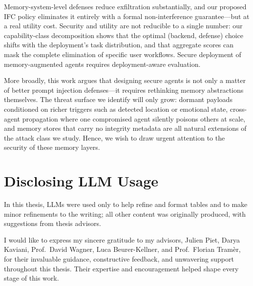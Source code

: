 \documentclass[sigconf]{acmart}
\begin{document}
Memory-system-level defenses reduce exfiltration substantially, and our 
proposed IFC policy eliminates it entirely with a formal non-interference 
guarantee---but at a real utility cost. Security and utility are not 
reducible to a single number: our capability-class decomposition shows that 
the optimal (backend, defense) choice shifts with the deployment's task 
distribution, and that aggregate scores can mask the complete elimination of 
specific user workflows. Secure deployment of memory-augmented agents requires 
deployment-aware evaluation.

More broadly, this work argues that designing secure agents is not only a 
matter of better prompt injection defenses---it requires rethinking memory 
abstractions themselves. The threat surface we identify will only grow: 
dormant payloads conditioned on richer triggers such as detected location or 
emotional state, cross-agent propagation where one compromised agent silently 
poisons others at scale, and memory stores that carry no integrity metadata 
are all natural extensions of the attack class we study. Hence, we wish to draw urgent attention to the security of these memory layers.

\section{Disclosing LLM Usage}
In this thesis, LLMs were used only to help refine and format tables and to make minor refinements to the writing; all other content was originally produced, with suggestions from thesis advisors.

\begin{acks}
I would like to express my sincere gratitude to my advisors, Julien Piet, Darya Kaviani, Prof.\ David Wagner, Luca Beurer-Kellner, and Prof.\ Florian Tram\`er, for their invaluable guidance, constructive feedback, and unwavering support throughout this thesis. Their expertise and encouragement helped shape every stage of this work.
\end{acks}


\balance




\end{document}
